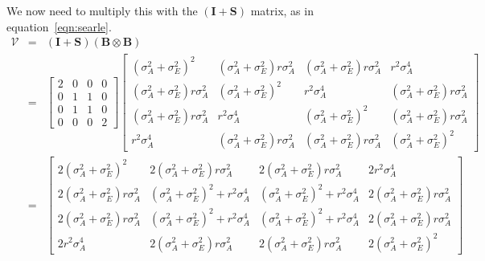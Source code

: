 \documentclass[titlepage,a4paper,12pt]{article}  %
\begin{document}
We now need to multiply this with the $(\bm{I} + \bm{S})$ matrix, as in equation~\ref{eqn:searle}. 
\begin{eqnarray}
\bm{\mathcal{V}} & = & (\bm{I} + \bm{S}) (\bm{B} \otimes \bm{B}) \\
 & = & \begin{bmatrix} 2 & 0 & 0 & 0 \\ 0 & 1 & 1 & 0 \\ 0 & 1 & 1 & 0 \\ 0 & 0 & 0 & 2 \end{bmatrix} 
\begin{bmatrix} (\sigma^{2}_{A} + \sigma^{2}_{E})^{2} & (\sigma^{2}_{A} + \sigma^{2}_{E})r \sigma^{2}_{A} & (\sigma^{2}_{A} + \sigma^{2}_{E})r \sigma^{2}_{A} & r^{2} \sigma^{4}_{A}\\
 (\sigma^{2}_{A} + \sigma^{2}_{E})r \sigma^{2}_{A} & (\sigma^{2}_{A} + \sigma^{2 }_{E})^{2} & r^{2} \sigma^{4}_{A} & (\sigma^{2}_{A} + \sigma^{2}_{E})r \sigma^{2}_{A} \\
(\sigma^{2}_{A} + \sigma^{2}_{E})r \sigma^{2}_{A} & r^{2} \sigma^{4}_{A} & (\sigma^{2}_{A} + \sigma^{2}_{E})^{2} & (\sigma^{2}_{A} + \sigma^{2}_{E})r \sigma^{2}_{A} \\
r^{2} \sigma^{4}_{A} & (\sigma^{2}_{A} + \sigma^{2}_{E})r \sigma^{2}_{A} & (\sigma^{2}_{A} + \sigma^{2}_{E})r \sigma^{2}_{A} & (\sigma^{2}_{A} + \sigma^{2}_{E})^{2} \end{bmatrix} \\
 & = &  \begin{bmatrix} 2 (\sigma^{2}_{A} + \sigma^{2}_{E})^{2} & 2 (\sigma^{2}_{A} + \sigma^{2}_{E})r \sigma^{2}_{A} & 2 (\sigma^{2}_{A} + \sigma^{2}_{E})r \sigma^{2}_{A} & 2 r^{2} \sigma^{4}_{A} \\
 2 (\sigma^{2}_{A} + \sigma^{2}_{E})r \sigma^{2}_{A} & (\sigma^{2}_{A} + \sigma^{2}_{E})^{2} + r^{2} \sigma^{4}_{A} & (\sigma^{2}_{A} + \sigma^{2}_{E})^{2} + r^{2} \sigma^{4}_{A} & 2 (\sigma^{2}_{A} + \sigma^{2}_{E})r \sigma^{2}_{A} \\
 2 (\sigma^{2}_{A} + \sigma^{2}_{E})r \sigma^{2}_{A} & (\sigma^{2}_{A} + \sigma^{2}_{E})^{2} + r^{2} \sigma^{4}_{A} & (\sigma^{2}_{A} + \sigma^{2}_{E})^{2} + r^{2} \sigma^{4}_{A} & 2 (\sigma^{2}_{A} + \sigma^{2}_{E})r \sigma^{2}_{A} \\
 2 r^{2} \sigma^{4}_{A} & 2 (\sigma^{2}_{A} + \sigma^{2}_{E})r \sigma^{2}_{A} & 2 (\sigma^{2}_{A} + \sigma^{2}_{E})r \sigma^{2}_{A} & 2 (\sigma^{2}_{A} + \sigma^{2}_{E})^{2} \end{bmatrix} \label{eqn:vcal}
\label{eqn:covres}
\end{eqnarray}
\end{document}
